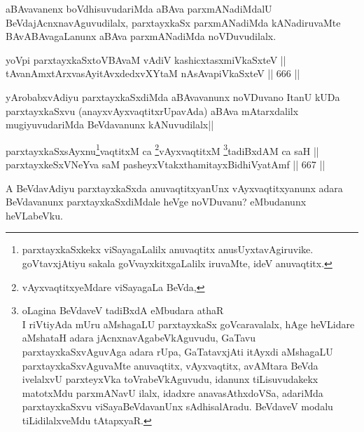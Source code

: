 \begin{artha} 
aBAvavanenx boVdhisuvudariMda aBAva parxmANadiMdalU 
BeVdajAcnxnavAguvudilalx, parxtayxkaSx parxmANadiMda kANadiruvaMte 
BAvABAvagaLanunx aBAva parxmANadiMda noVDuvudilalx.
\end{artha}


\begin{shl}
yoV\s pi parxtayxkaSxtoV\s BAvaM vAdiV kashicxtasxmiVkaSxteV || \\
tAvanAmxtArxvasAyitAvxdedxvXYtaM nAsAvapiVkaSxteV \hfill || 666 ||  
\end{shl}

\begin{artha} 
yArobabxvAdiyu parxtayxkaSxdiMda aBAvavanunx noVDuvano ItanU kUDa 
parxtayxkaSxvu (anayxvAyxvaqtitxrUpavAda) aBAva mAtarxdalilx 
mugiyuvudariMda BeVdavanunx kANuvudilalx||
\end{artha}


\begin{shl}
parxtayxkaSxsAyxnu\footnote{parxtayxkaSxkekx viSayagaLalilx anuvaqtitx 
anusUyxtavAgiruvike. goVtavxjAtiyu sakala goVvayxkitxgaLalilx 
iruvaMte, ideV anuvaqtitx.}vaqtitxM ca \footnote{vAyxvaqtitxyeMdare viSayagaLa BeVda,}vAyxvaqtitxM \footnote{oLagina BeVdaveV tadiBxdA eMbudara athaR \ndash \\ I riVtiyAda 
mUru aMshagaLU parxtayxkaSx goVcaravalalx, hAge heVLidare aMshataH 
adara jAcnxnavAgabeVkAguvudu, GaTavu parxtayxkaSxvAguvAga adara rUpa, 
GaTatavxjAti itAyxdi aMshagaLU parxtayxkaSxvAguvaMte anuvaqtitx, 
vAyxvaqtitx, avAMtara BeVda ivelalxvU parxteyxVka toVrabeVkAguvudu, 
idanunx tiLisuvudakekx matotxMdu parxmANavU ilalx, idadxre 
anavasAthxdoVSa, adariMda parxtayxkaSxvu viSayaBeVdavanUnx 
sAdhisalAradu. BeVdaveV modalu tiLidilalxveMdu tAtapxyaR.}tadiBxdAM ca saH || \\
parxtayxkeSxVNeYva saM pasheyxVtakxthamitayxBidhiVyatAmf \hfill || 667 ||  
\end{shl}

\begin{artha}
A BeVdavAdiyu parxtayxkaSxda anuvaqtitxyanUnx vAyxvaqtitxyanunx adara 
BeVdavanunx parxtayxkaSxdiMdale heVge noVDuvanu? eMbudanunx heVLabeVku.
\end{artha}

